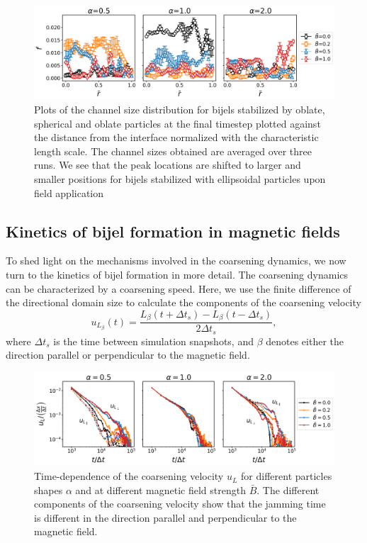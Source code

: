\begin{figure} 
        \centering 
        \includegraphics[scale = 0.4]{figures/results/paper1/CSD_ss.png} 
        \caption{Plots of the channel size distribution for bijels stabilized by oblate, spherical and oblate particles at the final timestep plotted
                 against the distance from the interface normalized with the characteristic length scale. The channel sizes obtained are averaged over 
                 three runs. We see that the peak locations are shifted to larger and smaller positions for bijels stabilized with ellipsoidal particles
                 upon field application} 
        \label{fig:CSD_B_ss}
    \end{figure}

\subsection{Kinetics of bijel formation in magnetic fields}

To shed light on the mechanisms involved in the coarsening dynamics,
we now turn to the kinetics of bijel formation in more detail. The
coarsening dynamics can be characterized by a coarsening speed. Here,
we use the finite difference of the directional domain size to
calculate the components of the coarsening velocity
%
\begin{equation}
u_{L_\beta}(t) = \frac{L_\beta(t+\Delta t_s)-L_\beta(t-\Delta t_s)}{2\Delta t_s} ,
\end{equation}
%
where \(\Delta t_s\) is the time between simulation
snapshots, and $\beta$ denotes either the direction parallel or perpendicular to the magnetic field.

\begin{figure}
\includegraphics[width=\textwidth]{figures/results/paper1/coarsening_vel.png}
\caption{Time-dependence of the coarsening velocity $u_L$ for different particles shapes $\alpha$  
and at different magnetic field strength $\bar{B}$. The different components of the coarsening velocity 
show that the jamming time is different in the direction parallel and perpendicular to the magnetic field.}
\label{fig:coarsening_velocity}
\end{figure}

